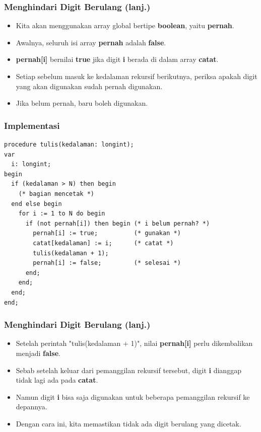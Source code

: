 \begin{frame}
\frametitle{Menghindari Digit Berulang (lanj.)}
\begin{itemize}
  \item Kita akan menggunakan array global bertipe \textbf{boolean}, yaitu \textbf{pernah}.
  \item Awalnya, seluruh isi array \textbf{pernah} adalah \textbf{false}.
  \item \textbf{pernah[i]} bernilai \textbf{true} jika digit \textbf{i} berada di dalam array \textbf{catat}.
  \item Setiap sebelum masuk ke kedalaman rekursif berikutnya, periksa apakah digit yang akan digunakan sudah pernah digunakan.
  \item Jika belum pernah, baru boleh digunakan.
\end{itemize}   
\end{frame}

\begin{frame}[fragile]
\frametitle{Implementasi}
\begin{lstlisting}
procedure tulis(kedalaman: longint);
var
  i: longint;
begin
  if (kedalaman > N) then begin
    (* bagian mencetak *)
  end else begin
    for i := 1 to N do begin
      if (not pernah[i]) then begin (* i belum pernah? *)
        pernah[i] := true;          (* gunakan *)
        catat[kedalaman] := i;      (* catat *)
        tulis(kedalaman + 1);
        pernah[i] := false;         (* selesai *)
      end; 
    end;
  end;
end;
\end{lstlisting}
\end{frame}
  
\begin{frame}
\frametitle{Menghindari Digit Berulang (lanj.)}
\begin{itemize}
  \item Setelah perintah "tulis(kedalaman + 1)", nilai \textbf{pernah[i]} perlu dikembalikan menjadi \textbf{false}.
  \item Sebab setelah keluar dari pemanggilan rekursif tersebut, digit \textbf{i} dianggap tidak lagi ada pada \textbf{catat}.
  \item Namun digit \textbf{i} bisa saja digunakan untuk beberapa pemanggilan rekursif ke depannya.
  \item Dengan cara ini, kita memastikan tidak ada digit berulang yang dicetak.
\end{itemize}   
\end{frame}

